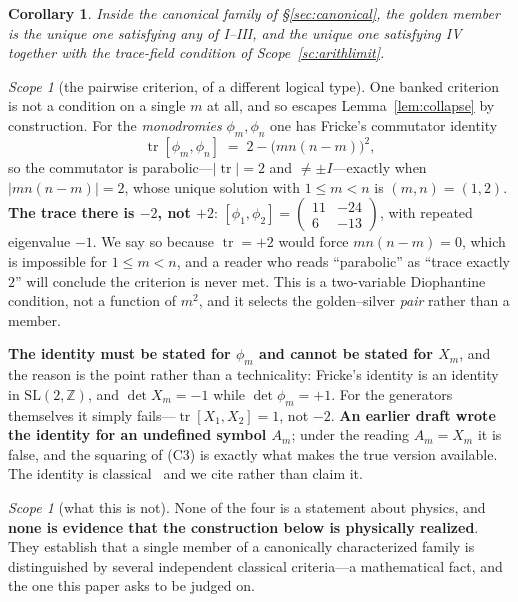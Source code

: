 \documentclass[11pt,reqno]{amsart}
\theoremstyle{plain}
\newtheorem{corollary}[theorem]{Corollary}
\theoremstyle{definition}
\theoremstyle{remark}
\newtheorem{scope}[theorem]{Scope}
\newcommand{\Z}{\mathbb{Z}}
\newcommand{\SL}{\mathrm{SL}}
\begin{document}
\begin{corollary}\label{cor:four}
Inside the canonical family of \S\ref{sec:canonical}, the golden member is the unique
one satisfying any of I--III, and the unique one satisfying IV together with the
trace-field condition of Scope~\ref{sc:arithlimit}.
\end{corollary}

\begin{scope}[the pairwise criterion, of a different logical type]\label{sc:pairwise}
One banked criterion is not a condition on a single $m$ at all, and so escapes
Lemma~\ref{lem:collapse} by construction. For the \emph{monodromies} $\phi_m,\phi_n$ one
has Fricke's commutator identity
\[
   \operatorname{tr}[\phi_m,\phi_n]\;=\;2-\bigl(mn(n-m)\bigr)^2 ,
\]
so the commutator is parabolic---$|\!\operatorname{tr}|=2$ and $\ne\pm I$---exactly when
$|mn(n-m)|=2$, whose unique solution with $1\le m<n$ is $(m,n)=(1,2)$. \textbf{The trace
there is $-2$, not $+2$}: $[\phi_1,\phi_2]=\left(\begin{smallmatrix}11&-24\\6&-13\end{smallmatrix}\right)$,
with repeated eigenvalue $-1$. We say so because $\operatorname{tr}=+2$ would force
$mn(n-m)=0$, which is impossible for $1\le m<n$, and a reader who reads ``parabolic'' as
``trace exactly $2$'' will conclude the criterion is never met. This is a two-variable Diophantine condition, not a
function of $m^2$, and it selects the golden--silver \emph{pair} rather than a member.

\textbf{The identity must be stated for $\phi_m$ and cannot be stated for $X_m$}, and the
reason is the point rather than a technicality: Fricke's identity is an identity in
$\SL(2,\Z)$, and $\det X_m=-1$ while $\det\phi_m=+1$. For the generators themselves it
simply fails---$\operatorname{tr}[X_1,X_2]=1$, not $-2$. \textbf{An earlier draft wrote
the identity for an undefined symbol $A_m$}; under the reading $A_m=X_m$ it is false, and
the squaring of (C3) is exactly what makes the true version available. The identity is classical~\cite{Fricke,Cohn} and we cite rather than claim it.
\end{scope}

\begin{scope}[what this is not]
None of the four is a statement about physics, and \textbf{none is evidence that the
construction below is physically realized}. They establish that a single member of a
canonically characterized family is distinguished by several independent classical
criteria---a mathematical fact, and the one this paper asks to be judged on.
\end{scope}
\end{document}
